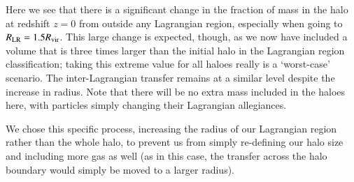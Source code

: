 Here we see that there is a significant change in the fraction of mass in the
halo at redshift $z=0$ from outside any Lagrangian region, especially when going to
$R_{\rm LR} = 1.5 R_{\rm vir}$. This large change is expected, though, as we now
have included a volume that is three times larger than the initial halo in the
Lagrangian region classification; taking this extreme value for all haloes
really is a `worst-case' scenario. The inter-Lagrangian transfer remains at a similar level
despite the increase in radius. Note that there will be no extra mass included in the
haloes here, with particles simply changing their Lagrangian allegiances.

We chose this specific process, increasing the radius of our Lagrangian
region rather than the whole halo, to prevent us from simply re-defining our
halo size and including more gas as well (as in this case, the transfer
across the halo boundary would simply be moved to a larger radius). 